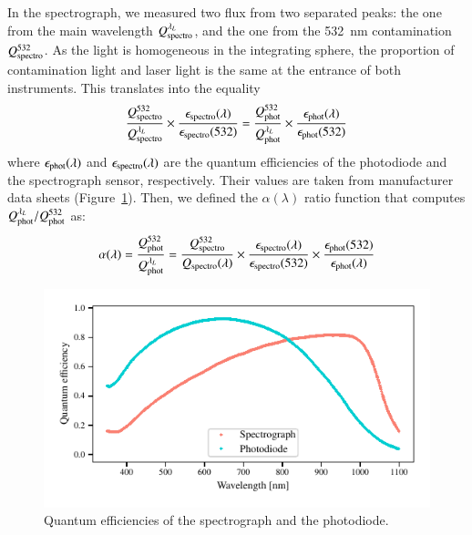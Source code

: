 In the spectrograph, we measured two flux from two separated peaks: the one from the main wavelength $Q_{\mathrm{spectro}}^{\lambda_L}$, and the one from the \SI{532}{\nm} contamination $Q_{\mathrm{spectro}}^{532}$. As the light is homogeneous in the integrating sphere, the proportion of contamination light and laser light is the same at the entrance of both instruments.  This translates into the equality
\begin{equation}
    \frac{Q_{\mathrm{spectro}}^{532}}{Q_{\mathrm{spectro}}^{\lambda_L}} \times \frac{\epsilon_{\mathrm{spectro}}(\lambda)}{\epsilon_{\mathrm{spectro}}(532)} = \frac{Q_{\mathrm{phot}}^{532}}{Q_{\mathrm{phot}}^{\lambda_L}} \times \frac{\epsilon_{\mathrm{phot}}(\lambda)}{\epsilon_{\mathrm{phot}}(532)}
    \label{eq:prev_alpha}
\end{equation}
where $\epsilon_{\mathrm{phot}}(\lambda)$ and $\epsilon_{\mathrm{spectro}}(\lambda)$ are the quantum efficiencies of the photodiode and the spectrograph sensor, respectively. Their values are taken from manufacturer data sheets (Figure~\ref{fig:QEs}). Then, we defined the $\alpha(\lambda)$ ratio function that computes $Q_{\mathrm{phot}}^{\lambda_L}/Q_{\mathrm{phot}}^{532}$ as:
\begin{equation}
    \alpha(\lambda) = \frac{Q_{\mathrm{phot}}^{532}}{Q_{\mathrm{phot}}^{\lambda_L}} = \frac{Q_{\mathrm{spectro}}^{532}}{Q_{\mathrm{spectro}}(\lambda)} \times \frac{\epsilon_{\mathrm{spectro}}(\lambda)}{\epsilon_{\mathrm{spectro}}(532)} \times \frac{\epsilon_{\mathrm{phot}}(532)}{\epsilon_{\mathrm{phot}}(\lambda)}  
    \label{eq:alpha}
\end{equation}

\begin{figure}[h]
    \centering
    \includegraphics[width=\columnwidth]{fig/qe_phototiode_spectro.pdf}
    \caption{Quantum efficiencies of the spectrograph and the photodiode.}
    \label{fig:QEs}
\end{figure}
    
